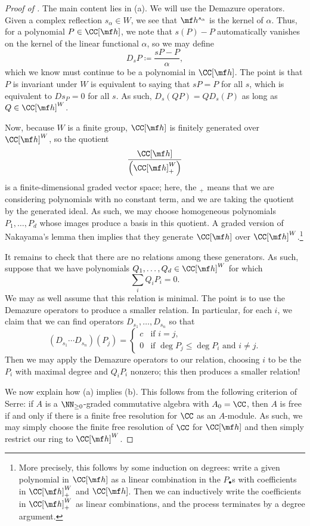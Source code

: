 \documentclass[../notes.tex]{subfiles}
\begin{document}
\begin{proof}[Proof of ]
	The main content lies in (a). We will use the Demazure operators. Given a complex reflection $s_\alpha\in W$, we see that $\mf h^{s_\alpha}$ is the kernel of $\alpha$. Thus, for a polynomial $P\in\CC[\mf h]$, we note that $s(P)-P$ automatically vanishes on the kernel of the linear functional $\alpha$, so we may define
	\[D_sP\coloneqq\frac{sP-P}\alpha,\]
	which we know must continue to be a polynomial in $\CC[\mf h]$. The point is that $P$ is invariant under $W$ is equivalent to saying that $sP=P$ for all $s$, which is equivalent to $Ds_P=0$ for all $s$. As such, $D_s(QP)=QD_s(P)$ as long as $Q\in\CC[\mf h]^W$.

	Now, because $W$ is a finite group, $\CC[\mf h]$ is finitely generated over $\CC[\mf h]^W$, so the quotient
	\[\frac{\CC[\mf h]}{\left(\CC[\mf h]_+^W\right)}\]
	is a finite-dimensional graded vector space; here, the $_+$ means that we are considering polynomials with no constant term, and we are taking the quotient by the generated ideal. As such, we may choose homogeneous polynomials $P_1,\ldots,P_d$ whose images produce a basis in this quotient. A graded version of Nakayama's lemma then implies that they generate $\CC[\mf h]$ over $\CC[\mf h]^W$.\footnote{More precisely, this follows by some induction on degrees: write a given polynomial in $\CC[\mf h]$ as a linear combination in the $P_\bullet$s with coefficients in $\CC[\mf h]_+^W$ and $\CC[\mf h]$. Then we can inductively write the coefficients in $\CC[\mf h]_+^W$ as linear combinations, and the process terminates by a degree argument.}
	
	It remains to check that there are no relations among these generators. As such, suppose that we have polynomials $Q_1,\ldots,Q_d\in\CC[\mf h]^W$ for which
	\[\sum_iQ_iP_i=0.\]
	We may as well assume that this relation is minimal. The point is to use the Demazure operators to produce a smaller relation. In particular, for each $i$, we claim that we can find operators $D_{s_1},\ldots,D_{s_n}$ so that
	\[(D_{s_1}\cdots D_{s_n})(P_j)=\begin{cases}
		c & \text{if }i=j, \\
		0 & \text{if }\deg P_j\le\deg P_i\text{ and }i\ne j.
	\end{cases}\]
	Then we may apply the Demazure operators to our relation, choosing $i$ to be the $P_i$ with maximal degree and $Q_iP_i$ nonzero; this then produces a smaller relation!

	We now explain how (a) implies (b). This follows from the following criterion of Serre: if $A$ is a $\NN_{\ge0}$-graded commutative algebra with $A_0=\CC$, then $A$ is free if and only if there is a finite free resolution for $\CC$ as an $A$-module. As such, we may simply choose the finite free resolution of $\CC$ for $\CC[\mf h]$ and then simply restrict our ring to $\CC[\mf h]^W$.
\end{proof}
\end{document}
